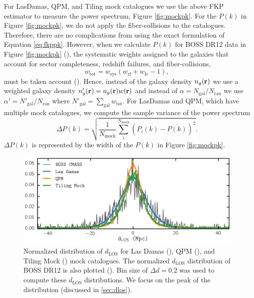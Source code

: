 \documentclass{emulateapj}
\begin{document}
For LasDamas, QPM, and Tiling mock catalogues we use the above FKP estimator to measure the power spectrum, Figure \ref{fig:mockpk}. For the $P(k)$ in Figure \ref{fig:mockpk}, we do not apply the fiber-collisions to the catalogues. Therefore, there are no complications from using the exact formulation of Equation \ref{eq:fkppk}. However, when we calculate $P(k)$ for BOSS DR12 data in Figure \ref{fig:mockpk} (\cmasscolor), the systematic weights assigned to the galaxies that account for sector completeness, redshift failures, and fiber-collisions, 
\begin{equation} \label{eq:weight}
w_\mathrm{tot} = w_\mathrm{sys} (w_\mathrm{rf} + w_\mathrm{fc} -1), 
\end{equation}
must be taken account (\citealt{Anderson:2012aa, Beutler:2014aa}). Hence, instead of the galaxy density $n_g({\bf r})$ we use a weighted galaxy density $n'_g({\bf r}) = n_g({\bf r}) w({\bf r})$ and instead of $\alpha = N_{\mathrm{gal}}/N_\mathrm{ran}$ we use $\alpha ' = N'_\mathrm{gal}/N_\mathrm{ran}$ where $N'_\mathrm{gal} = \sum_\mathrm{gal} w_\mathrm{tot}$. For LasDamas and QPM, which have multiple mock catalogues, we compute the sample variance of the power spectrum
\begin{equation} \label{eq:pk_var}
\Delta P (k)= \sqrt{\frac{1}{N_\mathrm{mock}} \sum\limits_i^{N_\mathrm{mock}} (P_i(k)- \overline{P(k)})^2 }. 
\end{equation}
$\Delta P(k)$ is represented by the width of the $P(k)$ in Figure \ref{fig:mockpk}. 

\begin{figure}
\begin{center}
\includegraphics[scale=0.575]{fcpaper_dlos_dist.png}
\caption{Normalized distribution of $d_{\mathrm{LOS}}$ for Las Damas (\ldgcolor), QPM (\qpmcolor), and Tiling Mock (\tmcolor) mock catalogues. The normalized $d_{\mathrm{LOS}}$ distribution of BOSS DR12 is also plotted (\cmasscolor). Bin size of $\Delta d = 0.2$ was used to compute these $d_{\mathrm{LOS}}$ distributions. We focus on the peak of the distribution (discussed in \ref{sec:dlos}).} \label{fig:d_los}
\end{center}
\end{figure}
\end{document}

